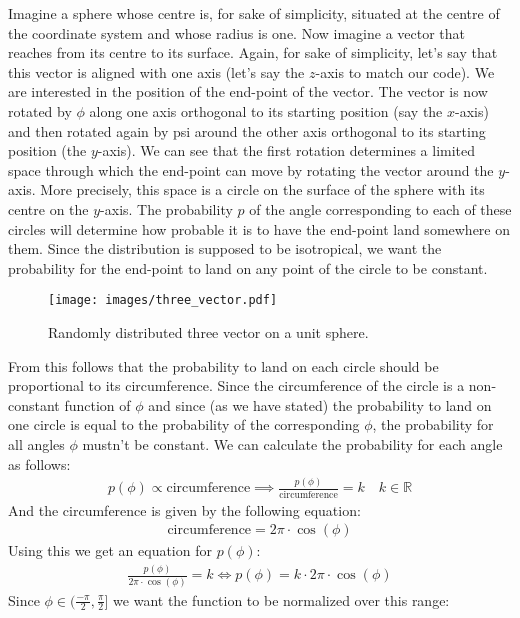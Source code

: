 \documentclass[12pt,a4paper,oneside,english]{article}
\begin{document}
Imagine a sphere whose centre is, for sake of simplicity, situated at the centre of the coordinate system and whose radius is one. Now imagine a vector that reaches from its centre to its surface. Again, for sake of simplicity, let’s say that this vector is aligned with one axis (let’s say the $z$-axis to match our code). We are interested in the position of the end-point of the vector. The vector is now rotated by $\phi$ along one axis orthogonal to its starting position (say the $x$-axis) and then rotated again by psi around the other axis orthogonal to its starting position (the $y$-axis). We can see that the first rotation determines a limited space through which the end-point can move by rotating the vector around the $y$-axis. More precisely, this space is a circle on the surface of the sphere with its centre on the $y$-axis. The probability $p$ of the angle corresponding to each of these circles will determine how probable it is to have the end-point land somewhere on them. Since the distribution is supposed to be isotropical, we want the probability for the end-point to land on any point of the circle to be constant.
\begin{figure}[H]
	\centering
	\texttt{[image: images/three\_vector.pdf]}
	\caption{Randomly distributed three vector on a unit sphere.}
	\label{fig:threevec}
\end{figure}
From this follows that the probability to land on each circle should be proportional to its circumference. Since the circumference of the circle is a non-constant function of $\phi$ and since (as we have stated) the probability to land on one circle is equal to the probability of the corresponding $\phi$, the probability for all angles $\phi$ mustn’t be constant. We can calculate the probability for each angle as follows:
\begin{align}
p(\phi) \propto \text{circumference} \implies \frac{p(\phi)}{\text{circumference}} = k \quad  k \in \mathbb{R}
\end{align}
And the circumference is given by the following equation:
\begin{align}
\text{circumference} = 2  \pi \cdot \cos(\phi)
\end{align}
Using this we get an equation for $p(\phi)$:
\begin{align}
\frac{p(\phi)}{2\pi\cdot \cos(\phi)} = k \Longleftrightarrow p(\phi) = k \cdot 2\pi \cdot \cos(\phi)
\end{align}
Since $\phi \in (\frac{-\pi}{2}, \frac{\pi}{2}]$ we want the function to be normalized over this range:
\end{document}
